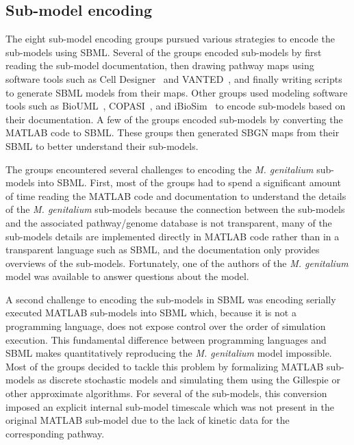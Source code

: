 \documentclass[journal,transmag]{IEEEtran}
\begin{document}
\subsection{Sub-model encoding}
The eight sub-model encoding groups pursued various strategies to encode the sub-models using SBML. Several of the groups encoded sub-models by first reading the sub-model documentation, then drawing pathway maps using software tools such as Cell Designer~\cite{funahashi2008celldesigner} and VANTED~\cite{Rohn2012}, and finally writing scripts to generate SBML models from their maps. Other groups used modeling software tools such as BioUML~\cite{Kolpakov2006}, COPASI~\cite{Mendes2009}, and iBioSim~\cite{Madsen2012} to encode sub-models based on their documentation. A few of the groups encoded sub-models by converting the MATLAB code to SBML. These groups then generated SBGN maps from their SBML to better understand their sub-models.

The groups encountered several challenges to encoding the \textit{M. genitalium} sub-models into SBML. First, most of the groups had to spend a significant amount of time reading the MATLAB code and documentation to understand the details of the \textit{M. genitalium} sub-models because the connection between the sub-models and the associated pathway/genome database is not transparent, many of the sub-models details are implemented directly in MATLAB code rather than in a transparent language such as SBML, and the documentation only provides overviews of the sub-models. Fortunately, one of the authors of the \textit{M. genitalium} model was available to answer questions about the model.

A second challenge to encoding the sub-models in SBML was encoding serially executed MATLAB sub-models into SBML which, because it is not a programming language, does not expose control over the order of simulation execution. This fundamental difference between programming languages and SBML makes quantitatively reproducing the \textit{M. genitalium} model impossible. Most of the groups decided to tackle this problem by formalizing MATLAB sub-models as discrete stochastic models and simulating them using the Gillespie or other approximate algorithms. For several of the sub-models, this conversion imposed an explicit internal sub-model timescale which was not present in the original MATLAB sub-model due to the lack of kinetic data for the corresponding pathway.
\end{document}
